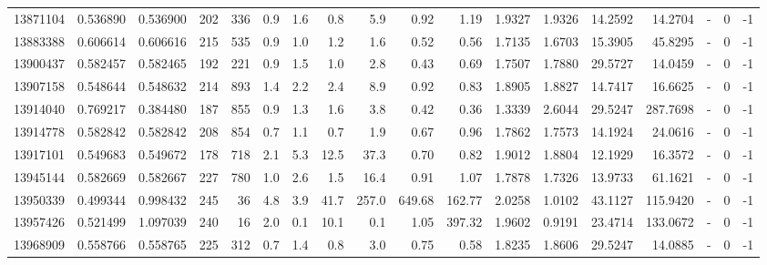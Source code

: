 \begin{tabular}{rrrrrrrrrrrrrrrlrr}
  13871104 & 0.536890 &   0.536900 &  202 &  336 &      0.9 &      1.6 &     0.8 &      5.9 &       0.92 &        1.19 &  1.9327 &  1.9326 &   14.2592 &   14.2704 &             - &        0 &         -1 \\
  13883388 & 0.606614 &   0.606616 &  215 &  535 &      0.9 &      1.0 &     1.2 &      1.6 &       0.52 &        0.56 &  1.7135 &  1.6703 &   15.3905 &   45.8295 &             - &        0 &         -1 \\
  13900437 & 0.582457 &   0.582465 &  192 &  221 &      0.9 &      1.5 &     1.0 &      2.8 &       0.43 &        0.69 &  1.7507 &  1.7880 &   29.5727 &   14.0459 &             - &        0 &         -1 \\
  13907158 & 0.548644 &   0.548632 &  214 &  893 &      1.4 &      2.2 &     2.4 &      8.9 &       0.92 &        0.83 &  1.8905 &  1.8827 &   14.7417 &   16.6625 &             - &        0 &         -1 \\
  13914040 & 0.769217 &   0.384480 &  187 &  855 &      0.9 &      1.3 &     1.6 &      3.8 &       0.42 &        0.36 &  1.3339 &  2.6044 &   29.5247 &  287.7698 &             - &        0 &         -1 \\
  13914778 & 0.582842 &   0.582842 &  208 &  854 &      0.7 &      1.1 &     0.7 &      1.9 &       0.67 &        0.96 &  1.7862 &  1.7573 &   14.1924 &   24.0616 &             - &        0 &         -1 \\
  13917101 & 0.549683 &   0.549672 &  178 &  718 &      2.1 &      5.3 &    12.5 &     37.3 &       0.70 &        0.82 &  1.9012 &  1.8804 &   12.1929 &   16.3572 &             - &        0 &         -1 \\
  13945144 & 0.582669 &   0.582667 &  227 &  780 &      1.0 &      2.6 &     1.5 &     16.4 &       0.91 &        1.07 &  1.7878 &  1.7326 &   13.9733 &   61.1621 &             - &        0 &         -1 \\
  13950339 & 0.499344 &   0.998432 &  245 &   36 &      4.8 &      3.9 &    41.7 &    257.0 &     649.68 &      162.77 &  2.0258 &  1.0102 &   43.1127 &  115.9420 &             - &        0 &         -1 \\
  13957426 & 0.521499 &   1.097039 &  240 &   16 &      2.0 &      0.1 &    10.1 &      0.1 &       1.05 &      397.32 &  1.9602 &  0.9191 &   23.4714 &  133.0672 &             - &        0 &         -1 \\
  13968909 & 0.558766 &   0.558765 &  225 &  312 &      0.7 &      1.4 &     0.8 &      3.0 &       0.75 &        0.58 &  1.8235 &  1.8606 &   29.5247 &   14.0885 &             - &        0 &         -1 \\

\end{tabular}
